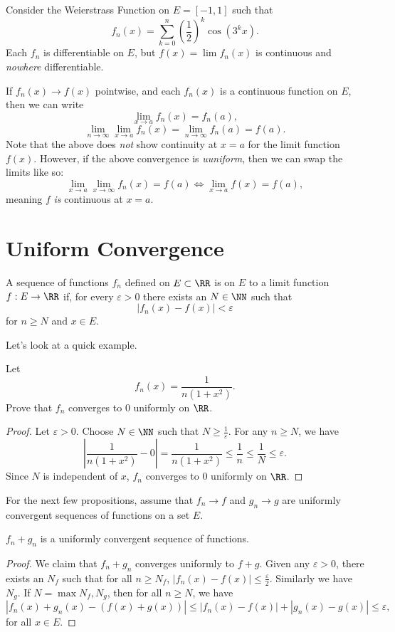 \begin{example}
	Consider the Weierstrass Function on $E = [-1,1]$ such that 
	\[ f_n(x) = \sum_{k=0}^n \left (\dfrac{1}{2} \right)^k \cos{(3^k x)}. \]
	Each $f_n$ is differentiable on $E$, but $f(x) = \lim f_n(x)$ is continuous and \emph{nowhere} differentiable. 
\end{example}

If $f_n(x) \to f(x)$ pointwise, and each $f_n(x)$ is a continuous function on $E$, then we can write
\[ \lim_{x\to a} f_n(x) = f_n(a), \]
\[ \lim_{n \to \infty} \lim_{x\to a} f_n(x) = \lim_{n\to\infty} f_n(a) = f(a). \]
Note that the above does \emph{not} show continuity at $x = a$ for the limit function $f(x)$. However, if the above convergence is \emph{uuniform}, then we can swap the limits like so:
\[ \lim_{x\to a} \lim_{x\to\infty} f_n(x) = f(a) \Longleftrightarrow \lim_{x\to a} f(x) = f(a), \] meaning $f$ \emph{is} continuous at $x = a$.
\section{Uniform Convergence}

\begin{definition}
	A sequence of functions $f_n$ defined on $ E\subset \RR$ is  on $E$ to a limit function $f : E \to \RR$ if, for every $\varepsilon > 0$ there exists an $N \in \NN$ such that 
	\[ |f_n(x) - f(x)| < \varepsilon \] for $n \geq N$ and $x \in E$. 
\end{definition}

Let's look at a quick example. 
\begin{example}
	Let \[ f_n(x) = \dfrac{1}{n(1+x^2)}. \] Prove that $f_n$ converges to 0 uniformly on $\RR$. 
\end{example}
\begin{proof}
	Let $\varepsilon > 0$. Choose $N \in \NN$ such that $N \geq \frac{1}{\varepsilon}$. For any $n \geq N$, we have 
	\[ \left | \dfrac{1}{n(1+x^2)} - 0 \right | = \dfrac{1}{n(1+x^2)} \leq \dfrac{1}{n} \leq \dfrac{1}{N} \leq \varepsilon. \]
	Since $N$ is independent of $x$, $f_n$ converges to 0 uniformly on $\RR$. 
\end{proof}

For the next few propositions, assume that $f_n \to f$ and $g_n \to g$ are uniformly convergent sequences of functions on a set $E$. 
\begin{proposition}
	$f_n + g_n$ is a uniformly convergent sequence of functions. 
\end{proposition}
\begin{proof}
	We claim that	$f_n + g_n$ converges uniformly to $f + g$. 
	Given any $\varepsilon > 0$, there exists an $N_f$ such that for all $n \geq N_f$, $|f_n(x) - f(x)| \leq \frac{\varepsilon}{2}$. Similarly we have $N_g$. If $N = \max{N_f, N_g}$, then for all $n \geq N$, we have 
	\[ |f_n(x) + g_n(x) - (f(x) + g(x))| \leq |f_n(x) - f(x)| + |g_n(x) - g(x)|\leq \varepsilon, \] for all $x \in E$. 
\end{proof}

